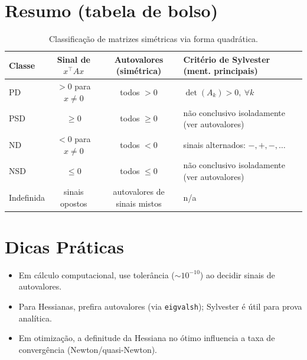 \documentclass[9pt,a4paper]{extarticle}
\begin{document}
\section{Resumo (tabela de bolso)}

\begin{table}[!ht]
\centering
\small
\setlength{\tabcolsep}{5pt}
\renewcommand{\arraystretch}{1.15}
\begin{tabularx}{\textwidth}{@{}lccX@{}}
\toprule
\textbf{Classe} & \textbf{Sinal de $x^\top A x$} & \textbf{Autovalores (sim\'etrica)} & \textbf{Crit\'erio de Sylvester (ment. principais)} \\
\midrule
PD & $>0$ para $x\ne 0$ & todos $>0$ & $\det(A_k)>0,\ \forall k$ \\
PSD & $\ge 0$ & todos $\ge 0$ & n\~ao conclusivo isoladamente (ver autovalores) \\
ND & $<0$ para $x\ne 0$ & todos $<0$ & sinais alternados: $-,+,-,\dots$ \\
NSD & $\le 0$ & todos $\le 0$ & n\~ao conclusivo isoladamente (ver autovalores) \\
Indefinida & sinais opostos & autovalores de sinais mistos & n/a \\
\bottomrule
\end{tabularx}
\caption{Classifica\c c\~ao de matrizes sim\'etricas via forma quadr\'atica.}
\end{table}

\section{Dicas Pr\'aticas}
\begin{itemize}
  \item Em c\'alculo computacional, use toler\^ancia ($\sim 10^{-10}$) ao decidir sinais de autovalores.
  \item Para Hessianas, prefira autovalores (via \texttt{eigvalsh}); Sylvester \'e \'util para prova anal\'itica.
  \item Em otimiza\c c\~ao, a definitude da Hessiana no \'otimo influencia a taxa de converg\^encia (Newton/quasi-Newton).
\end{itemize}
\end{document}
